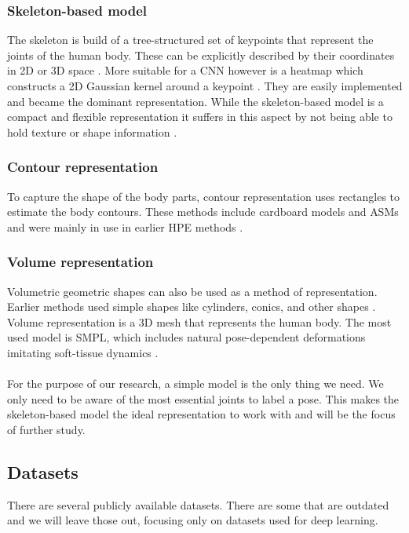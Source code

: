 \subsubsection{Skeleton-based model}
The skeleton is build of a tree-structured set of keypoints that represent the joints of the human body.
These can be explicitly described by their coordinates in 2D or 3D space \cite{Toshev2014}.
More suitable for a \gls{CNN} however is a heatmap which constructs a 2D Gaussian kernel around a keypoint \cite{Liu2104}\cite{SWARH}.
They are easily implemented and became the dominant representation.
While the skeleton-based model is a compact and flexible representation it suffers in this aspect by not being able to hold texture or shape information \cite{Zheng2012}.

\subsubsection{Contour representation}
To capture the shape of the body parts, contour representation uses rectangles to estimate the body contours.
These methods include cardboard models \cite{Ju96} and \gls{ASMs} \cite{COOTES95} and were mainly in use in earlier \gls{HPE} methods \cite{Chen2000}.

\subsubsection{Volume representation}
Volumetric geometric shapes can also be used as a method of representation.
Earlier methods used simple shapes like cylinders, conics, and other shapes \cite{Sidenbladh2000}.
Volume representation is a 3D mesh that represents the human body.
The most used model is \gls{SMPL}, which includes natural pose-dependent deformations imitating soft-tissue dynamics \cite{Loper2015}.  
\\
\\
For the purpose of our research, a simple model is the only thing we need.
We only need to be aware of the most essential joints to label a pose.
This makes the skeleton-based model the ideal representation to work with and will be the focus of further study.

\subsection{Datasets}
There are several publicly available datasets.
There are some that are outdated and we will leave those out, focusing only on datasets used for deep learning.

